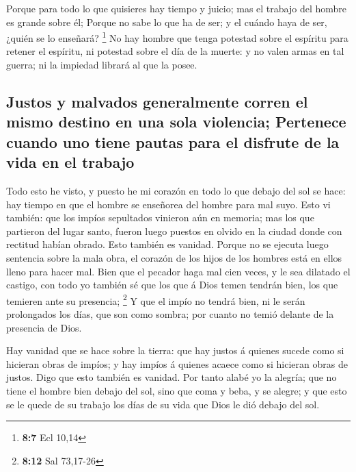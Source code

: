  Porque para todo lo que quisieres hay tiempo y juicio;
mas el trabajo del hombre es grande sobre él;  Porque no
sabe lo que ha de ser; y el cuándo haya de ser, ¿quién se lo enseñará?
\footnote{\textbf{8:7} Ecl 10,14}  No hay hombre que tenga
potestad sobre el espíritu para retener el espíritu, ni potestad sobre
el día de la muerte: y no valen armas en tal guerra; ni la impiedad
librará al que la posee.

\hypertarget{justos-y-malvados-generalmente-corren-el-mismo-destino-en-una-sola-violencia-pertenece-cuando-uno-tiene-pautas-para-el-disfrute-de-la-vida-en-el-trabajo}{%
\subsection{Justos y malvados generalmente corren el mismo destino en
una sola violencia; Pertenece cuando uno tiene pautas para el disfrute
de la vida en el
trabajo}\label{justos-y-malvados-generalmente-corren-el-mismo-destino-en-una-sola-violencia-pertenece-cuando-uno-tiene-pautas-para-el-disfrute-de-la-vida-en-el-trabajo}}

 Todo esto he visto, y puesto he mi corazón en todo lo que
debajo del sol se hace: hay tiempo en que el hombre se enseñorea del
hombre para mal suyo.  Esto vi también: que los impíos
sepultados vinieron aún en memoria; mas los que partieron del lugar
santo, fueron luego puestos en olvido en la ciudad donde con rectitud
habían obrado. Esto también es vanidad.  Porque no se
ejecuta luego sentencia sobre la mala obra, el corazón de los hijos de
los hombres está en ellos lleno para hacer mal.  Bien que
el pecador haga mal cien veces, y le sea dilatado el castigo, con todo
yo también sé que los que á Dios temen tendrán bien, los que temieren
ante su presencia; \footnote{\textbf{8:12} Sal 73,17-26} 
Y que el impío no tendrá bien, ni le serán prolongados los días, que son
como sombra; por cuanto no temió delante de la presencia de Dios.

 Hay vanidad que se hace sobre la tierra: que hay justos
á quienes sucede como si hicieran obras de impíos; y hay impíos á
quienes acaece como si hicieran obras de justos. Digo que esto también
es vanidad.  Por tanto alabé yo la alegría; que no tiene
el hombre bien debajo del sol, sino que coma y beba, y se alegre; y que
esto se le quede de su trabajo los días de su vida que Dios le dió
debajo del sol.

